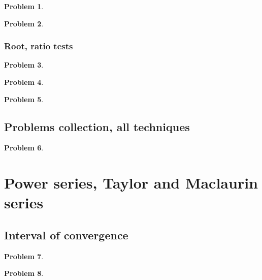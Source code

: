 \documentclass{article}
\newtheorem{problem}{Problem}
\begin{document}
\begin{problem}

\end{problem}
\begin{problem}

\end{problem}

\subsubsection{Root, ratio tests}
\begin{problem}

\end{problem}
\begin{problem}

\end{problem}


\begin{problem}

\end{problem}
\subsection{Problems collection, all techniques}
\begin{problem}

\end{problem}

\section{Power series, Taylor and Maclaurin series}
\subsection{Interval of convergence}
\begin{problem}

\end{problem}


\begin{problem}

\end{problem}
\end{document}

